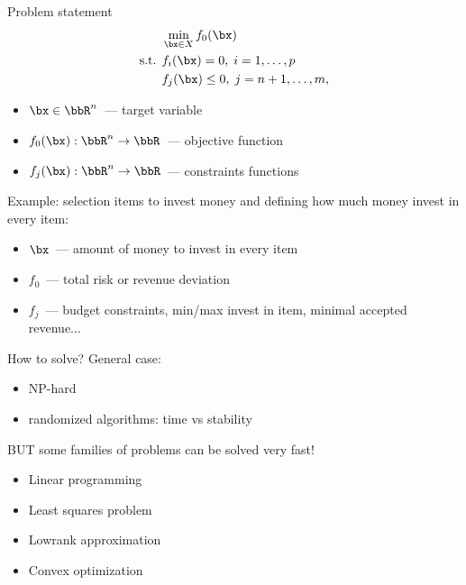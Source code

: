 \documentclass[12pt]{beamer}
\begin{document}
\begin{frame}{Problem statement}
\begin{equation*}
\begin{split}
&\min\limits_{\bx \in X} f_0(\bx)\\
\text{s.t. } & f_i(\bx) = 0, \; i = 1,\ldots,p\\
& f_j(\bx) \leq 0, \; j = n+1,\ldots,m,
\end{split}
\end{equation*}
\begin{itemize}
\item $\bx \in \bbR^n$~--- target variable
\item $f_0(\bx): \bbR^n \rightarrow \bbR$~--- objective function
\item $f_j(\bx): \bbR^n \rightarrow \bbR$~--- constraints functions
\end{itemize}
Example: selection items to invest money and defining how much money invest in every item:
\begin{itemize}
\item $\bx$~--- amount of money to invest in every item
\item $f_0$~--- total risk or revenue deviation
\item $f_j$~--- budget constraints, min/max invest in item, minimal accepted revenue...
\end{itemize}

\end{frame}

\begin{frame}{How to solve?}
General case:
\begin{itemize}
\item NP-hard
\item {\small randomized algorithms: time vs stability}
\end{itemize}

{\small BUT some families of problems can be solved very fast!}

\begin{itemize}
\item Linear programming
\item Least squares problem
\item Lowrank approximation
\item Convex optimization
\end{itemize}
\end{frame}
\end{document}

